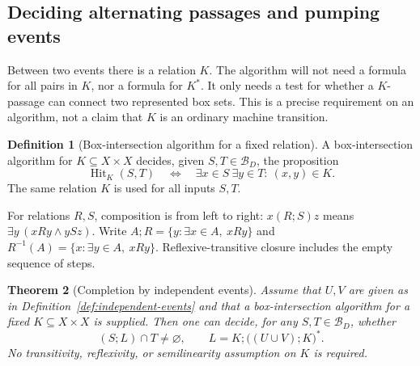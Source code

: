 \documentclass[11pt,a4paper]{article}
\newtheorem{theorem}{Theorem}[section]
\theoremstyle{definition}
\newtheorem{definition}[theorem]{Definition}
\theoremstyle{remark}
\begin{document}
\subsection{Deciding alternating passages and pumping events}

Between two events there is a relation \(K\). The algorithm will not
need a formula for all pairs in \(K\), nor a formula for \(K^*\).
It only needs a test for whether a \(K\)-passage can connect two
represented box sets. This is a precise requirement on an algorithm,
not a claim that \(K\) is an ordinary machine transition.

\begin{definition}[Box-intersection algorithm for a fixed relation]
\label{def:box-intersection}
A box-intersection algorithm for \(K\subseteq X\times X\) decides,
given \(S,T\in\mathcal B_D\), the proposition
\[
 \operatorname{Hit}_K(S,T)
 \quad\Longleftrightarrow\quad
 \exists x\in S\ \exists y\in T:\ (x,y)\in K.
\]
The same relation \(K\) is used for all inputs \(S,T\).
\end{definition}

For relations \(R,S\), composition is from left to right:
\(x(R;S)z\) means \(\exists y\,(xRy\land ySz)\).
Write \(A;R=\{y:\exists x\in A,\ xRy\}\) and
\(R^{-1}(A)=\{x:\exists y\in A,\ xRy\}\).
Reflexive-transitive closure includes the empty sequence of steps.

\begin{theorem}[Completion by independent events]
\label{thm:formal-completion}
Assume that \(U,V\) are given as in
Definition~\ref{def:independent-events} and that a box-intersection
algorithm for a fixed \(K\subseteq X\times X\) is supplied.
Then one can decide, for any \(S,T\in\mathcal B_D\), whether
\[
 (S;L)\cap T\neq\varnothing,
 \qquad
 L=K;\bigl((U\cup V);K\bigr)^*.
\]
No transitivity, reflexivity, or semilinearity assumption on \(K\)
is required.
\end{theorem}
\end{document}
